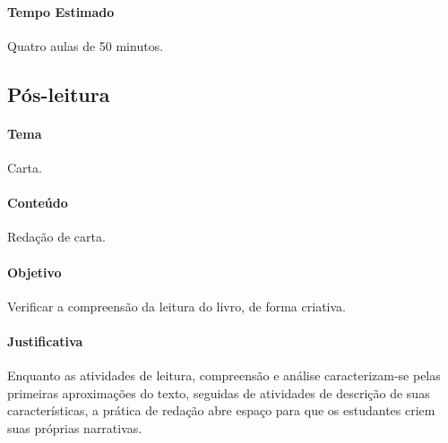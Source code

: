 \documentclass[11pt]{extarticle}
\begin{document}
\paragraph{Tempo Estimado} Quatro aulas de 50 minutos.


\subsection{Pós-leitura}


\paragraph{Tema} Carta. 

\paragraph{Conteúdo} Redação de carta.

\paragraph{Objetivo} Verificar a compreensão da leitura do livro, de forma criativa. 

\paragraph{Justificativa} Enquanto as atividades de leitura, compreensão e análise caracterizam-se pelas primeiras aproximações do texto, seguidas de atividades de descrição de suas características, a prática de redação abre espaço para que os estudantes criem suas próprias narrativas. 
\end{document}
